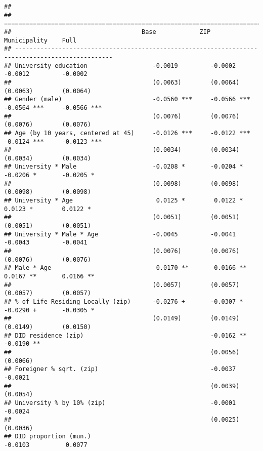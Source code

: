 \documentclass[
]{article}
\begin{document}
\begin{verbatim}
## 
## =================================================================================================
##                                    Base            ZIP             Municipality    Full          
## -------------------------------------------------------------------------------------------------
## University education                  -0.0019         -0.0002         -0.0012         -0.0002    
##                                       (0.0063)        (0.0064)        (0.0063)        (0.0064)   
## Gender (male)                         -0.0560 ***     -0.0566 ***     -0.0564 ***     -0.0566 ***
##                                       (0.0076)        (0.0076)        (0.0076)        (0.0076)   
## Age (by 10 years, centered at 45)     -0.0126 ***     -0.0122 ***     -0.0124 ***     -0.0123 ***
##                                       (0.0034)        (0.0034)        (0.0034)        (0.0034)   
## University * Male                     -0.0208 *       -0.0204 *       -0.0206 *       -0.0205 *  
##                                       (0.0098)        (0.0098)        (0.0098)        (0.0098)   
## University * Age                       0.0125 *        0.0122 *        0.0123 *        0.0122 *  
##                                       (0.0051)        (0.0051)        (0.0051)        (0.0051)   
## University * Male * Age               -0.0045         -0.0041         -0.0043         -0.0041    
##                                       (0.0076)        (0.0076)        (0.0076)        (0.0076)   
## Male * Age                             0.0170 **       0.0166 **       0.0167 **       0.0166 ** 
##                                       (0.0057)        (0.0057)        (0.0057)        (0.0057)   
## % of Life Residing Locally (zip)      -0.0276 +       -0.0307 *       -0.0290 +       -0.0305 *  
##                                       (0.0149)        (0.0149)        (0.0149)        (0.0150)   
## DID residence (zip)                                   -0.0162 **                      -0.0190 ** 
##                                                       (0.0056)                        (0.0066)   
## Foreigner % sqrt. (zip)                               -0.0037                         -0.0021    
##                                                       (0.0039)                        (0.0054)   
## University % by 10% (zip)                             -0.0001                         -0.0024    
##                                                       (0.0025)                        (0.0036)   
## DID proportion (mun.)                                                 -0.0103          0.0077    

\end{verbatim}
\end{document}
